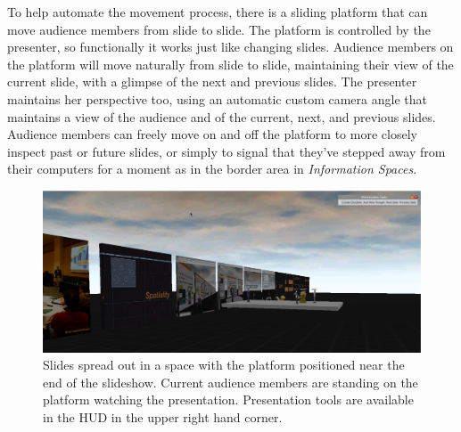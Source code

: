 To help automate the movement process, there is a sliding platform that can move audience members from slide to slide. The platform is controlled by the presenter, so functionally it works just like changing slides.  Audience members on the platform will move naturally from slide to slide, maintaining their view of the current slide, with a glimpse of the next and previous slides. The presenter maintains her perspective too, using an automatic custom camera angle that maintains a view of the audience and of the current, next, and previous slides. Audience members can freely move on and off the platform to more closely inspect past or future slides, or simply to signal that they've stepped away from their computers for a moment as in the border area in \emph{Information Spaces}. 

\begin{figure}[t]
	\includegraphics{figures/presentation_screenshot.png}
	\caption{Slides spread out in a space with the platform positioned near the end of the slideshow. Current audience members are standing on the platform watching the presentation. Presentation tools are available in the HUD in the upper right hand corner.}
	\label{fig:presentation_overview}
\end{figure}

